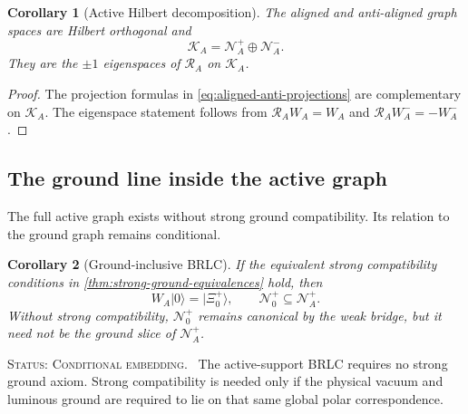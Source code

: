 \documentclass[11pt,reqno]{scrartcl}
\newcommand{\RA}{\mathcal R_{A}}
\newcommand{\NzeroPlus}{\mathscr N_{0}^{+}}
\newcommand{\ket}[1]{\lvert #1\rangle}
\newcommand{\statuslabel}[1]{\par\smallskip\noindent\textsc{Status: #1.}\ }
\newcommand{\actK}{\mathscr K_{A}}
\newcommand{\NAplus}{\mathscr N_{A}^{+}}
\newcommand{\NAminus}{\mathscr N_{A}^{-}}
\newcommand{\WA}{W_{A}}
\theoremstyle{plain}
\newtheorem{corollary}[corollary]{Corollary}
\theoremstyle{definition}
\theoremstyle{remark}
\begin{document}
\begin{corollary}[Active Hilbert decomposition]
\label{cor:active-graph-decomposition}
The aligned and anti-aligned graph spaces are Hilbert orthogonal and
\begin{equation}
  \boxed{
  \actK=\NAplus\oplus\NAminus.}
  \label{eq:active-Hilbert-Witt-decomposition}
\end{equation}
They are the \(\pm1\) eigenspaces of \(\RA\) on \(\actK\).
\end{corollary}

\begin{proof}
The projection formulas in \eqref{eq:aligned-anti-projections} are
complementary on \(\actK\).  The eigenspace statement follows from
\(\RA\WA=\WA\) and \(\RA W_A^-=-W_A^-\).
\end{proof}

\subsection{The ground line inside the active graph}

The full active graph exists without strong ground compatibility.  Its
relation to the ground graph remains conditional.

\begin{corollary}[Ground-inclusive BRLC]
\label{cor:ground-inclusive-BRLC}
If the equivalent strong compatibility conditions in
\cref{thm:strong-ground-equivalences} hold, then
\begin{equation}
  \WA\ket0=\ket{\Xi_0^+},
  \qquad
  \NzeroPlus\subseteq\NAplus.
  \label{eq:ground-in-global-BRLC}
\end{equation}
Without strong compatibility, \(\NzeroPlus\) remains canonical by the weak
bridge, but it need not be the ground slice of \(\NAplus\).
\end{corollary}

\statuslabel{Conditional embedding} The active-support BRLC requires no
strong ground axiom.  Strong compatibility is needed only if the physical
vacuum and luminous ground are required to lie on that same global polar
correspondence.
\end{document}
